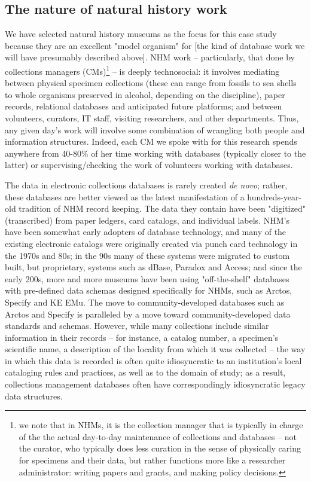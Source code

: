 \subsection{The nature of natural history work}

We have selected natural history museums as the focus for this case study because they are an excellent "model organism" for [the kind of database work we will have presumably described above]. NHM work -- particularly, that done by collections managers (CMs)\footnote{we note that in NHMs, it is the collection manager that is typically in charge of the the actual day-to-day maintenance of collections and databases -- not the curator, who typically does less curation in the sense of physically caring for specimens and their data, but rather functions more like a researcher administrator: writing papers and grants, and making policy decisions.} -- is deeply technosocial: it involves mediating between physical specimen collections (these can range from fossils to sea shells to whole organisms preserved in alcohol, depending on the discipline), paper records, relational databases and anticipated future platforms; and between volunteers, curators, IT staff, visiting researchers, and other departments. Thus, any given day’s work will involve some combination of wrangling both people and information structures. Indeed, each CM we spoke with for this research spends anywhere from 40-80\% of her time working with databases (typically closer to the latter) or supervising/checking the work of volunteers working with databases.

The data in electronic collections databases is rarely created \textit{de novo}; rather, these databases are better viewed as the latest manifestation of a hundreds-year-old tradition of NHM record keeping. The data they contain have been "digitized" (transcribed) from paper ledgers, card catalogs, and individual labels. NHM's have been somewhat early adopters of database technology, and many of the existing electronic catalogs were originally created via punch card technology in the 1970s and 80s; in the 90s many of these systems were migrated to custom built, but proprietary, systems such as dBase, Paradox and Access; and since the early 200s, more and more museums have been using "off-the-shelf" databases with pre-defined data schemas designed specifically for NHMs, such as Arctos, Specify and KE EMu. The move to community-developed databases such as Arctos and Specify is paralleled by a move toward community-developed data standards and schemas.  However, while many collections include similar information in their records – for instance, a catalog number, a specimen’s scientific name, a description of the locality from which it was collected – the way in which this data is recorded is often quite idiosyncratic to an institution’s local cataloging rules and practices, as well as to the domain of study; as a result, collections management databases often have correspondingly idiosyncratic legacy data structures.

